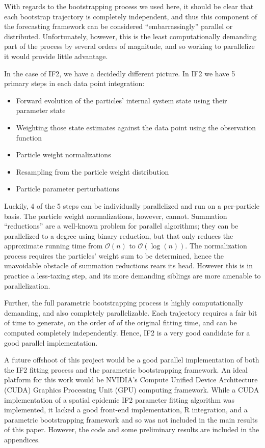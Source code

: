 	With regards to the bootstrapping process we used here, it should be clear that each bootstrap trajectory is completely independent, and thus this component of the forecasting framework can be considered ``embarrassingly'' parallel or distributed. Unfortunately, however, this is the least computationally demanding part of the process by several orders of magnitude, and so working to parallelize it would provide little advantage.

	In the case of IF2, we have a decidedly different picture. In IF2 we have 5 primary steps in each data point integration: 

	\begin{itemize}
		\item Forward evolution of the particles' internal system state using their parameter state
		\item Weighting those state estimates against the data point using the observation function
		\item Particle weight normalizations
		\item Resampling from the particle weight distribution
		\item Particle parameter perturbations
	\end{itemize}

	Luckily, 4 of the 5 steps can be individually parallelized and run on a per-particle basis. The particle weight normalizations, however, cannot. Summation ``reductions'' are a well-known problem for parallel algorithms; they can be parallelized to a degree using binary reduction, but that only reduces the approximate running time from $\mathcal{O}(n)$ to $\mathcal{O}(\log(n))$. The normalization process requires the particles' weight sum to be determined, hence the unavoidable obstacle of summation reductions rears its head. However this is in practice a less-taxing step, and its more demanding siblings are more amenable to parallelization.

	Further, the full parametric bootstrapping process is highly computationally demanding, and also completely parallelizable. Each trajectory requires a fair bit of time to generate, on the order of of the original fitting time, and can be computed completely independently. Hence, IF2 is a very good candidate for a good parallel implementation.

	A future offshoot of this project would be a good parallel implementation of both the IF2 fitting process and the parametric bootstrapping framework. An ideal platform for this work would be NVIDIA's Compute Unified Device Architecture (CUDA) Graphics Processing Unit (GPU) computing framework. While a CUDA implementation of a spatial epidemic IF2 parameter fitting algorithm was implemented, it lacked a good front-end implementation, R integration, and a parametric bootstrapping framework and so was not included in the main results of this paper. However, the code and some preliminary results are included in the appendices.

